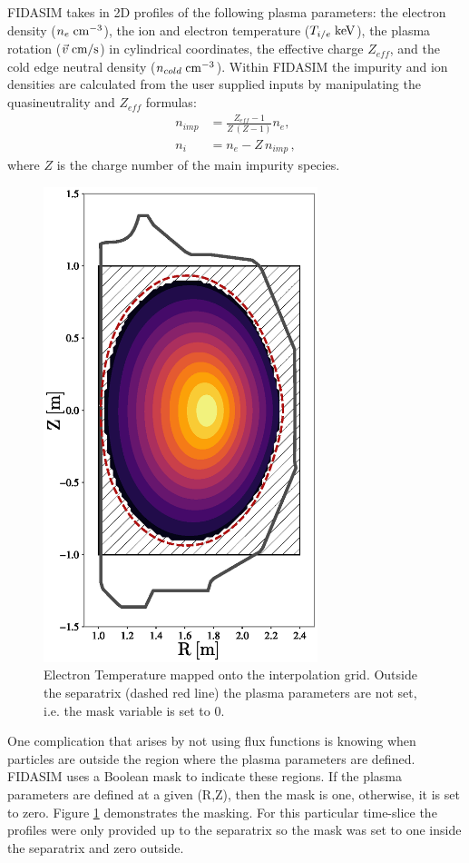 FIDASIM takes in 2D profiles of the following plasma parameters: the electron density ($n_e\;\rm{cm^{-3}}$), the ion and electron temperature ($T_{i/e}\;\rm{keV}$), the plasma rotation ($\vec{v}\;\rm{cm/s}$) in cylindrical coordinates, the effective charge $Z_{eff}$, and the cold edge neutral density ($n_{cold}\;\rm{cm^{-3}}$). Within FIDASIM the impurity and ion densities are calculated from the user supplied inputs by manipulating the quasineutrality and $Z_{eff}$ formulas:
\begin{equation}
\begin{split}
    n_{imp} &= \frac{Z_{eff} - 1}{Z\,(Z-1)} n_e, \\
    n_i &= n_e - Z\,n_{imp}\,,
\end{split}
\end{equation}
where $Z$ is the charge number of the main impurity species.
\begin{figure}[h!]
    \centering
    \includegraphics[width=8cm]{figures/te_cross_section.eps}
    \caption{Electron Temperature mapped onto the interpolation grid. Outside the separatrix (dashed red line) the plasma parameters are not set, i.e. the mask variable is set to 0.}
    \label{fig:te_mask}
\end{figure}
One complication that arises by not using flux functions is knowing when particles are outside the region where the plasma parameters are defined. FIDASIM uses a Boolean mask to indicate these regions. If the plasma parameters are defined at a given (R,Z), then the mask is one, otherwise, it is set to zero. Figure \ref{fig:te_mask} demonstrates the masking. For this particular time-slice the profiles were only provided up to the separatrix so the mask was set to one inside the separatrix and zero outside.

